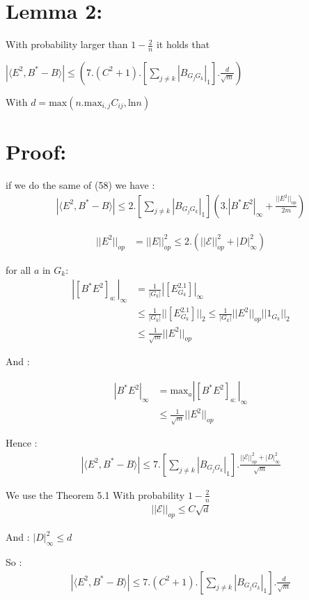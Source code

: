 \section*{Lemma 2:}

With probability larger than $1-\frac{2}{n}$ it holds that

\begin{center}
$|\langle E^2, B^*-B \rangle| \le (7.(C^2+1).[\sum_{j\neq k}|B_{G_jG_k}|_1].\frac{d}{\sqrt{m}})$
\end{center}

With $d=\mbox{max}(n.\mbox{max}_{i,j} C_{ij}, \mbox{ln}n)$

\section*{Proof:}

if we do the same of (58) we have :
\begin{align*}
|\langle E^2, B^*-B \rangle| \le 2.[\sum_{j\neq k}|B_{G_jG_k}|_1](3.|B^*E^2|_{\infty} + \frac{||E^2||_{op}}{2m})
\end{align*}

\begin{align*}
||E^2||_{op} &= ||E||_{op}^2 \le 2.(||\mathcal{E}||_{op}^2 + |D|_{\infty}^2)
\end{align*}

for all $a$ in $G_k$:
\begin{align*}
|[B^*E^2]_{a:}|_{\infty} &= \frac{1}{|G_k|}|[E^2.1_{G_k}]|_{\infty} \\ &\le \frac{1}{|G_k|}||[E^2.1_{G_k}]||_2 \le \frac{1}{|G_k|}||E^2||_{op}||1_{G_k}||_2 \\ & \le \frac{1}{\sqrt{m}}||E^2||_{op}
\end{align*}

And :

\begin{align*}
|B^*E^2|_{\infty} &= \mbox{max}_{a}|[B^*E^2]_{a:}|_{\infty} \\ & \le \frac{1}{\sqrt{m}}||E^2||_{op}
\end{align*}

Hence :
\begin{align*}
|\langle E^2, B^*-B \rangle| \le 7.[\sum_{j\neq k}|B_{G_jG_k}|_1].\frac{||\mathcal{E}||_{op}^2 + |D|_{\infty}^2}{\sqrt{m}}
\end{align*}

We use the Theorem 5.1 
With probability $1-\frac{2}{n}$
\begin{align*}
||\mathcal{E}||_{op} \le C\sqrt{d}
\end{align*}

And : $|D|_{\infty}^2 \le d$

So : 
\begin{align*}
|\langle E^2, B^*-B \rangle| \le 7.(C^2+1).[\sum_{j\neq k}|B_{G_jG_k}|_1].\frac{d}{\sqrt{m}}
\end{align*}